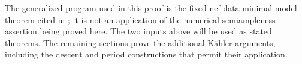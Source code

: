 The generalized program used in this proof is the fixed-nef-data
minimal-model theorem cited in \cite{P}; it is not an application of
the numerical semiampleness assertion being proved here. The two inputs
above will be used as stated theorems. The remaining sections prove the
additional K\"ahler arguments, including the descent and period
constructions that permit their application.
